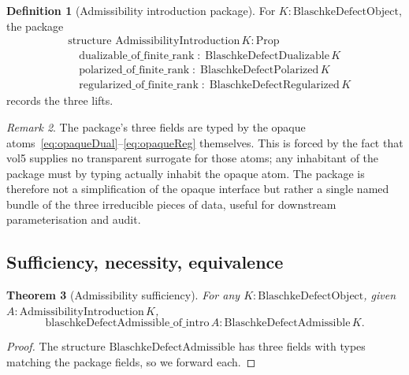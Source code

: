 \documentclass[12pt]{article}
\newtheorem{theorem}{Theorem}[section]
\theoremstyle{definition}
\newtheorem{definition}[theorem]{Definition}
\theoremstyle{remark}
\newtheorem{remark}[theorem]{Remark}
\begin{document}
\begin{definition}[Admissibility introduction package]\label{def:admissibilityPackage}
For $K : \mathrm{BlaschkeDefectObject}$, the package
\begin{equation}\label{eq:admissibilityPackage}
\begin{aligned}
  &\text{structure } \mathrm{AdmissibilityIntroduction}\,K : \mathrm{Prop} \\
  &\quad \mathrm{dualizable\_of\_finite\_rank}\;:\; \mathrm{BlaschkeDefectDualizable}\,K \\
  &\quad \mathrm{polarized\_of\_finite\_rank}\;:\; \mathrm{BlaschkeDefectPolarized}\,K \\
  &\quad \mathrm{regularized\_of\_finite\_rank}\;:\; \mathrm{BlaschkeDefectRegularized}\,K
\end{aligned}
\end{equation}
records the three lifts.
\end{definition}

\begin{remark}\label{rem:packageVsAtoms}
The package's three fields are typed by the opaque atoms~\eqref{eq:opaqueDual}--\eqref{eq:opaqueReg} themselves. This is forced by the fact that vol5 supplies no transparent surrogate for those atoms; any inhabitant of the package must by typing actually inhabit the opaque atom. The package is therefore not a simplification of the opaque interface but rather a single named bundle of the three irreducible pieces of data, useful for downstream parameterisation and audit.
\end{remark}

\subsection{Sufficiency, necessity, equivalence}\label{subsec:admEquiv}

\begin{theorem}[Admissibility sufficiency]\label{thm:admissibilitySuff}
For any $K : \mathrm{BlaschkeDefectObject}$, given $A : \mathrm{AdmissibilityIntroduction}\,K$,
\begin{equation}\label{eq:admSuff}
  \mathrm{blaschkeDefectAdmissible\_of\_intro}\,A
  : \mathrm{BlaschkeDefectAdmissible}\,K.
\end{equation}
\end{theorem}

\begin{proof}
The structure $\mathrm{BlaschkeDefectAdmissible}$ has three fields with types matching the package fields, so we forward each.
\end{proof}
\end{document}
